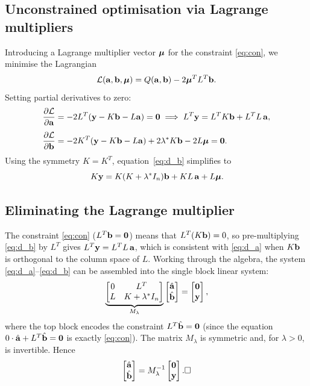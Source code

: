 \subsection*{Unconstrained optimisation via Lagrange multipliers}

Introducing a Lagrange multiplier vector $\boldsymbol{\mu}$ for the constraint
\eqref{eq:con}, we minimise the Lagrangian
\[
  \mathcal{L}(\mathbf{a},\mathbf{b},\boldsymbol{\mu})
  = Q(\mathbf{a},\mathbf{b}) - 2\boldsymbol{\mu}^T L^T\mathbf{b}.
\]
Setting partial derivatives to zero:
\begin{align}
  \frac{\partial\mathcal{L}}{\partial\mathbf{a}}
  &= -2L^T(\mathbf{y} - K\mathbf{b} - L\mathbf{a}) = \mathbf{0}
  \implies L^T\mathbf{y} = L^T K\mathbf{b} + L^T L\,\mathbf{a}, \label{eq:d_a}\\[4pt]
  \frac{\partial\mathcal{L}}{\partial\mathbf{b}}
  &= -2K^T(\mathbf{y} - K\mathbf{b} - L\mathbf{a}) + 2\lambda^* K\mathbf{b} - 2L\boldsymbol{\mu} = \mathbf{0}.
  \label{eq:d_b}
\end{align}
Using the symmetry $K = K^T$, equation~\eqref{eq:d_b} simplifies to
\[
  K\mathbf{y} = K(K + \lambda^* I_n)\mathbf{b} + KL\,\mathbf{a} + L\boldsymbol{\mu}.
\]

\subsection*{Eliminating the Lagrange multiplier}

The constraint \eqref{eq:con} ($L^T\mathbf{b}=\mathbf{0}$) means that
$L^T(K\mathbf{b})=0$, so pre-multiplying \eqref{eq:d_b} by $L^T$ gives
$L^T\mathbf{y} = L^T L\,\mathbf{a}$, which is consistent with \eqref{eq:d_a} when
$K\mathbf{b}$ is orthogonal to the column space of $L$.  Working through the
algebra, the system \eqref{eq:d_a}--\eqref{eq:d_b} can be assembled
into the single block linear system:
\begin{equation}
  \underbrace{
  \begin{bmatrix}
    0 & L^T \\
    L & K + \lambda^* I_n
  \end{bmatrix}
  }_{M_\lambda}
  \begin{bmatrix}
    \hat{\mathbf{a}} \\ \hat{\mathbf{b}}
  \end{bmatrix}
  =
  \begin{bmatrix}
    \mathbf{0} \\ \mathbf{y}
  \end{bmatrix},
  \label{eq:block}
\end{equation}
where the top block encodes the constraint $L^T\hat{\mathbf{b}} = \mathbf{0}$
(since the equation $0\cdot\hat{\mathbf{a}} + L^T\hat{\mathbf{b}} = \mathbf{0}$ is
exactly \eqref{eq:con}).  The matrix $M_\lambda$ is symmetric and, for
$\lambda>0$, is invertible.  Hence
\[
  \begin{bmatrix}
    \hat\ba \\ \hat\bb
  \end{bmatrix}
  = M_\lambda^{-1}
  \begin{bmatrix}
    \mathbf{0} \\ \by
  \end{bmatrix}.
  \hfill\square
\]

